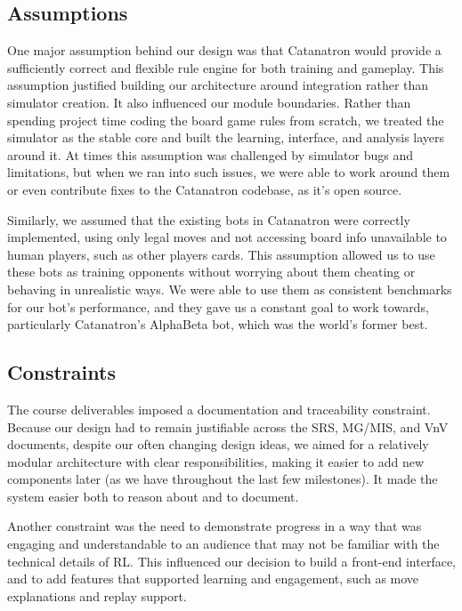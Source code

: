 \documentclass{article}
\begin{document}
\subsection{Assumptions}

One major assumption behind our design was that Catanatron would provide a sufficiently correct
and flexible rule engine for both training and gameplay.
This assumption justified building our architecture around integration rather than simulator creation.
It also influenced our module boundaries.
Rather than spending project time coding the board game rules from scratch, we treated the simulator as
the stable core and built the learning, interface, and analysis layers around it.
At times this assumption was challenged by simulator bugs and limitations, but when we ran into such issues,
we were able to work around them or even contribute fixes to the Catanatron codebase, as it's open source.

Similarly, we assumed that the existing bots in Catanatron were correctly implemented, using only legal moves
and not accessing board info unavailable to human players, such as other players cards.
This assumption allowed us to use these bots as training opponents without worrying about them cheating or behaving
in unrealistic ways.
We were able to use them as consistent benchmarks for our bot's performance, and they gave us a constant goal
to work towards, particularly Catanatron's AlphaBeta bot, which was the world's former best.

\subsection{Constraints}

The course deliverables imposed a documentation and traceability constraint.
Because our design had to remain justifiable across the SRS, MG/MIS, and VnV documents,
despite our often changing design ideas, we aimed for a relatively modular architecture with clear
responsibilities, making it easier to add new components later (as we have throughout the last few milestones).
It made the system easier both to reason about and to document.

Another constraint was the need to demonstrate progress in a way that was engaging and understandable to an audience
that may not be familiar with the technical details of RL.
This influenced our decision to build a front-end interface, and to add features that supported learning and
engagement, such as move explanations and replay support.
\end{document}
